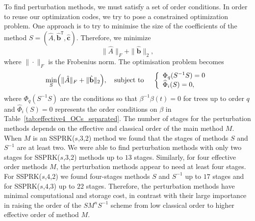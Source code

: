 To find perturbation methods, we must satisfy a set of order conditions.  In order to reuse our optimization codes, we try to pose a constrained optimization problem.  One approach %
 is to try to minimise the size of the coefficients of the method \( S  = (\hat{A}, \hat{\textbf{b}}^{\texttt{T}}, \hat{\textbf{c}}) \). Therefore, we minimize
\begin{displaymath}
    \|\hat{A}\|_{F} + \|\hat{\textbf{b}}\|_{2},
\end{displaymath}
where \( \|\cdot\|_{F} \) is the Frobenius norm. The optimisation problem becomes
\begin{equation}\label{eq5.2}
    \min_{S} \Bigl(\|\hat{A}\|_{F} + \|\hat{\textbf{b}}\|_{2}\Bigr), \quad \text{subject to } \quad \left\{
                                                                                     \begin{array}{ll}
                                                                                           \Phi_{q}(S^{-1}S) = 0 \\
                                                                                           \widehat{\Phi}_{i}(S) = 0,
                                                                                     \end{array}
                                                                             \right.
\end{equation}
where \( \Phi_{q}(S^{-1}S) \) are the conditions
so that \( \beta^{-1}\beta(t) = 0 \) for trees up to order \( q \)
 and \( \widehat{\Phi}_{i}(S) = 0 \) represents the order conditions on \( \beta \) in Table~\ref{tab:effective4_OCs_separated}. The number of stages for the perturbation methods depends on the effective and classical order of the main method \( M \). When \( M \) is an SSPRK(\( s \),\( 3 \),\( 2 \)) method we found that the stages of methods \( S \) and \( S^{-1} \) are at least two. We were able to find perturbation methods with only two stages for SSPRK(\( s \),\( 3 \),\( 2 \)) methods up to \( 13 \) stages. Similarly, for four effective order methods \( M \), the perturbation methods appear to need at least four stages. For SSPRK(\( s \),\( 4 \),\( 2 \)) we found four-stages methods \( S \) and \( S^{-1} \) up to \( 17 \) stages and for SSPRK(\( s \),\( 4 \),\( 3 \)) up to \( 22 \) stages. Therefore, the perturbation methods have minimal computational and storage cost, in contrast with their large importance in raising the order of the \( SM^{n}S^{-1} \) scheme from low classical order to higher effective order of method \( M \).

